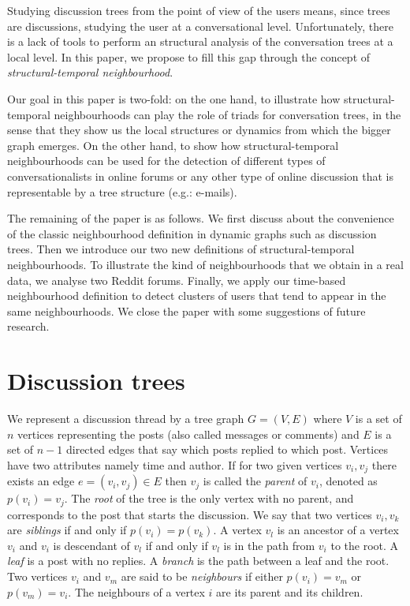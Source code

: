 \documentclass[conference]{IEEEtran}
\begin{document}
Studying discussion trees from the point of view of the users means, since trees are discussions, studying the user at a conversational level. Unfortunately, there is a lack of tools to perform an structural analysis of the conversation trees at a local level. In this paper, we propose to fill this gap through the concept of \textit{structural-temporal neighbourhood}.  


Our goal in this paper is two-fold: on the one hand, to illustrate how structural-temporal neighbourhoods can play the role of triads for conversation trees, in the sense that they show us the local structures or dynamics from which the bigger graph emerges. On the other hand, to show how structural-temporal neighbourhoods can be used for the detection of different types of conversationalists in online forums or any other type of online discussion that is representable by a tree structure (e.g.: e-mails).

The remaining of the paper is as follows. We first discuss about the convenience of the classic neighbourhood definition in dynamic graphs such as discussion trees. Then we introduce our two new definitions of structural-temporal neighbourhoods. To illustrate the kind of neighbourhoods that we obtain in a real data, we analyse two Reddit forums. Finally, we apply our time-based neighbourhood definition to detect clusters of users that tend to appear in the same neighbourhoods. We close the paper with some suggestions of future research.

\section{Discussion trees}
We represent a discussion thread by a tree graph $G=(V,E)$ where $V$ is a set of $n$ vertices representing the posts (also called messages or comments) and $E$ is a set of $n-1$ directed edges that say which posts replied to which post. Vertices have two attributes namely time and author. If for two given vertices $v_i,v_j$ there exists an edge  $e=(v_i, v_j) \in E$ then $v_j$ is called the \textit{parent} of $v_i$, denoted as $p(v_i)=v_j$. The \textit{root} of the tree is the only vertex with no parent, and corresponds to the post that starts the discussion. We say that two vertices $v_i,v_k$ are \textit{siblings} if and only if $p(v_i)=p(v_k)$. A vertex $v_l$ is an ancestor of a vertex $v_i$ and $v_i$ is descendant of $v_l$ if and only if $v_l$ is in the path from $v_i$ to the root. A \textit{leaf} is a post with no replies. A \textit{branch} is the path between a leaf and the root. Two vertices $v_i$ and $v_m$ are said to be \textit{neighbours} if either $p(v_i)=v_m$ or $p(v_m)=v_i$. The neighbours of a vertex $i$ are its parent and its children.
\end{document}
